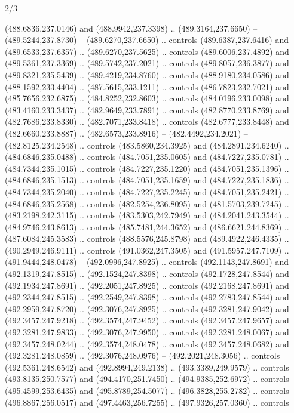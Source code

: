 \begin{flagdescription}{2/3}
\begin{scope}[xshift=0.5\flaglength,yshift=0.5\flagwidth,scale=\flagwidth/495.65]
\begin{scope}[y=0.8pt, x=0.8pt, yscale=-1,shift={(-463.76,-309.78)}]
  (488.6836,237.0146) and (488.9942,237.3398) .. (489.3164,237.6650) --
  (489.5244,237.8730) -- (489.6270,237.6650) .. controls (489.6387,237.6416) and
  (489.6533,237.6357) .. (489.6270,237.5625) .. controls (489.6006,237.4892) and
  (489.5361,237.3369) .. (489.5742,237.2021) .. controls (489.8057,236.3877) and
  (489.8321,235.5439) .. (489.4219,234.8760) .. controls (488.9180,234.0586) and
  (488.1592,233.4404) .. (487.5615,233.1211) .. controls (486.7823,232.7021) and
  (485.7656,232.6875) .. (484.8252,232.8603) .. controls (484.0196,233.0098) and
  (483.4160,233.3437) .. (482.9649,233.7891) .. controls (482.8770,233.8769) and
  (482.7686,233.8330) .. (482.7071,233.8418) .. controls (482.6777,233.8448) and
  (482.6660,233.8887) .. (482.6573,233.8916) -- (482.4492,234.2021) --
  (482.8125,234.2548) .. controls (483.5860,234.3925) and (484.2891,234.6240) ..
  (484.6846,235.0488) .. controls (484.7051,235.0605) and (484.7227,235.0781) ..
  (484.7344,235.1015) .. controls (484.7227,235.1220) and (484.7051,235.1396) ..
  (484.6846,235.1513) .. controls (484.7051,235.1659) and (484.7227,235.1836) ..
  (484.7344,235.2040) .. controls (484.7227,235.2245) and (484.7051,235.2421) ..
  (484.6846,235.2568) .. controls (482.5254,236.8095) and (481.5703,239.7245) ..
  (483.2198,242.3115) .. controls (483.5303,242.7949) and (484.2041,243.3544) ..
  (484.9746,243.8613) .. controls (485.7481,244.3652) and (486.6621,244.8369) ..
  (487.6084,245.3583) .. controls (488.5576,245.8798) and (489.4922,246.4335) ..
  (490.2949,246.9111) .. controls (491.0362,247.3505) and (491.5957,247.7109) ..
  (491.9444,248.0478) -- (492.0996,247.8925) .. controls (492.1143,247.8691) and
  (492.1319,247.8515) .. (492.1524,247.8398) .. controls (492.1728,247.8544) and
  (492.1934,247.8691) .. (492.2051,247.8925) .. controls (492.2168,247.8691) and
  (492.2344,247.8515) .. (492.2549,247.8398) .. controls (492.2783,247.8544) and
  (492.2959,247.8720) .. (492.3076,247.8925) .. controls (492.3281,247.9042) and
  (492.3457,247.9218) .. (492.3574,247.9452) .. controls (492.3457,247.9657) and
  (492.3281,247.9833) .. (492.3076,247.9950) .. controls (492.3281,248.0067) and
  (492.3457,248.0244) .. (492.3574,248.0478) .. controls (492.3457,248.0682) and
  (492.3281,248.0859) .. (492.3076,248.0976) -- (492.2021,248.3056) .. controls
  (492.5361,248.6542) and (492.8994,249.2138) .. (493.3389,249.9579) .. controls
  (493.8135,250.7577) and (494.4170,251.7450) .. (494.9385,252.6972) .. controls
  (495.4599,253.6435) and (495.8789,254.5077) .. (496.3828,255.2782) .. controls
  (496.8867,256.0517) and (497.4463,256.7255) .. (497.9326,257.0360) .. controls

\end{scope}
\end{scope}
\end{flagdescription}
